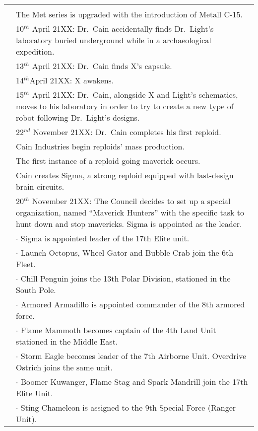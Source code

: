 \begin{tabularx}{\linewidth}{l X}
	\midrule
	\rowcolor{Aquamarine}
	\multicolumn{2}{c}{\textbf{21XX}}\\
	\addlinespace[1.5ex]
	\tabdot& The Met series is upgraded with the introduction of Metall C-15.\\
	\tabdot&10$^{th}$ April 21XX: Dr.~Cain accidentally finds Dr.~Light's laboratory buried underground while in a archaeological expedition.\\
	\tabdot&13$^{th}$ April 21XX: Dr.~Cain finds X's capsule.\\ 
	\tabdot& 14$^{th} $April 21XX: X awakens.\\
	\tabdot& 15$^{th}$ April 21XX: Dr.~Cain, alongside X and Light's schematics, moves to his laboratory in order to try to create a new type of robot following Dr.~Light's designs.\\
	\tabdot& 22$^{nd}$ November 21XX: Dr.~Cain completes his first reploid.\\
	\tabdot& Cain Industries begin reploids' mass production.\\
	\tabdot& The first instance of a reploid going maverick occurs.\\
	\tabdot& Cain creates Sigma, a strong reploid equipped with last-design brain circuits.\\
	\tabdot& 20$^{th}$ November 21XX: The Council decides to set up a special organization, named ``Maverick Hunters'' with the specific task to hunt down and stop mavericks. Sigma is appointed as the leader.\\
	\tabline& $\cdot$ Sigma is appointed leader of the 17th Elite unit.\\
	\tabline& $\cdot$ Launch Octopus, Wheel Gator and Bubble Crab join the 6th Fleet.\\
	\tabline& $\cdot$ Chill Penguin joins the 13th Polar Division, stationed in the South Pole.\\
	\tabline& $\cdot$ Armored Armadillo is appointed commander of the 8th armored force.\\
	\tabline& $\cdot$ Flame Mammoth becomes captain of the 4th Land Unit stationed in the Middle East.\\
	\tabline& $\cdot$ Storm Eagle becomes leader of the 7th Airborne Unit. Overdrive Ostrich joins the same unit.\\
	\tabline& $\cdot$ Boomer Kuwanger, Flame Stag and Spark Mandrill join the 17th Elite Unit.\\
	\tabline& $\cdot$ Sting Chameleon is assigned to the 9th Special Force (Ranger Unit).\\

\end{tabularx}
